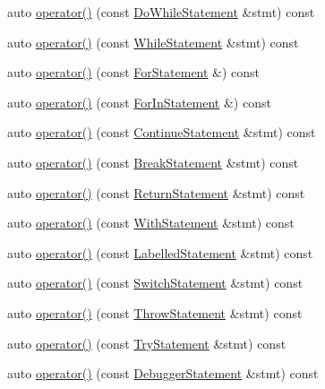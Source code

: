 \begin{DoxyCompactItemize}
\item 
auto \hyperlink{struct_print_visitor_aca7d03bd32485eda4a592a25398fec19}{operator()} (const \hyperlink{struct_do_while_statement}{Do\+While\+Statement} \&stmt) const
\item 
auto \hyperlink{struct_print_visitor_a692e923841a123c9a7556135f05b56e6}{operator()} (const \hyperlink{struct_while_statement}{While\+Statement} \&stmt) const
\item 
auto \hyperlink{struct_print_visitor_a9f765a5cd4fb7134194c038df25a0cf0}{operator()} (const \hyperlink{struct_for_statement}{For\+Statement} \&) const
\item 
auto \hyperlink{struct_print_visitor_a7d901b13fb4ba71db8214072884f7cbd}{operator()} (const \hyperlink{struct_for_in_statement}{For\+In\+Statement} \&) const
\item 
auto \hyperlink{struct_print_visitor_aa76bcc5abeee9c1d32f4ae5a61c69181}{operator()} (const \hyperlink{struct_continue_statement}{Continue\+Statement} \&stmt) const
\item 
auto \hyperlink{struct_print_visitor_ad8d36cb338e942510a23a2e354883482}{operator()} (const \hyperlink{struct_break_statement}{Break\+Statement} \&stmt) const
\item 
auto \hyperlink{struct_print_visitor_a569cb948fc52cb74ba3d71ff84e9855f}{operator()} (const \hyperlink{struct_return_statement}{Return\+Statement} \&stmt) const
\item 
auto \hyperlink{struct_print_visitor_a40cae42afb27c61b94e8f873bd6edcba}{operator()} (const \hyperlink{struct_with_statement}{With\+Statement} \&stmt) const
\item 
auto \hyperlink{struct_print_visitor_a838f3178b1a45397289129c728f2e007}{operator()} (const \hyperlink{struct_labelled_statement}{Labelled\+Statement} \&stmt) const
\item 
auto \hyperlink{struct_print_visitor_a47502bd069c9341c56fa1480a1615b2d}{operator()} (const \hyperlink{struct_switch_statement}{Switch\+Statement} \&stmt) const
\item 
auto \hyperlink{struct_print_visitor_a8803d34f6d9b462de7b64858938c6dd7}{operator()} (const \hyperlink{struct_throw_statement}{Throw\+Statement} \&stmt) const
\item 
auto \hyperlink{struct_print_visitor_a4cb9e06de37324a01f256b55ccc23e63}{operator()} (const \hyperlink{struct_try_statement}{Try\+Statement} \&stmt) const
\item 
auto \hyperlink{struct_print_visitor_a17ca87eeae2aa16b58cf1b31742eb4d5}{operator()} (const \hyperlink{struct_debugger_statement}{Debugger\+Statement} \&stmt) const

\end{DoxyCompactItemize}
